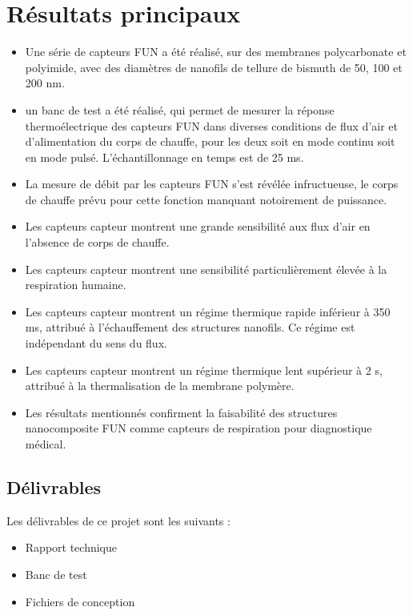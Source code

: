 \section{Résultats principaux}
\begin{itemize}
      \item Une série de capteurs FUN a été réalisé, sur des membranes polycarbonate et polyimide, avec des diamètres de nanofils de tellure de bismuth de
            50, 100 et 200 nm. 
      \item un banc de test a été réalisé, qui permet de mesurer la réponse thermoélectrique des capteurs FUN dans diverses conditions de flux d'air et
            d'alimentation du corps de chauffe, pour les deux soit en mode continu soit en mode pulsé. L'échantillonnage en temps est de 25 ms. 
      \item La mesure de débit par les capteurs FUN s'est révélée infructueuse, le corps de chauffe prévu pour cette fonction manquant notoirement de
            puissance. 
      \item Les capteurs \gls{capteur} montrent une grande sensibilité aux flux d'air en l'absence de corps de chauffe.
      \item Les capteurs \gls{capteur} montrent une sensibilité particulièrement élevée à la respiration humaine.
      \item Les capteurs \gls{capteur} montrent un régime thermique rapide inférieur à 350 ms, attribué à l'échauffement des structures nanofils. Ce régime est
            indépendant du sens du flux. 
      \item Les capteurs \gls{capteur} montrent un régime thermique lent supérieur à 2 s, attribué à la thermalisation de la membrane polymère.
      \item Les résultats mentionnés confirment la faisabilité des structures nanocomposite FUN comme capteurs de respiration pour diagnostique médical.
\end{itemize}

\subsection{Délivrables}
Les délivrables de ce projet sont les suivants :
\begin{itemize}
      \item Rapport technique
      \item Banc de test
      \item Fichiers de conception
\end{itemize}


